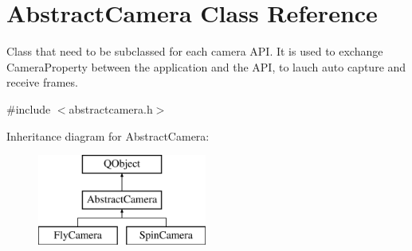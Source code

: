 \hypertarget{class_abstract_camera}{}\section{Abstract\+Camera Class Reference}
\label{class_abstract_camera}


Class that need to be subclassed for each camera A\+PI. It is used to exchange Camera\+Property between the application and the A\+PI, to lauch auto capture and receive frames.  




{\ttfamily \#include $<$abstractcamera.\+h$>$}

Inheritance diagram for Abstract\+Camera\+:\begin{figure}[H]
\begin{center}
\leavevmode
\includegraphics[height=3.000000cm]{class_abstract_camera}
\end{center}
\end{figure}
